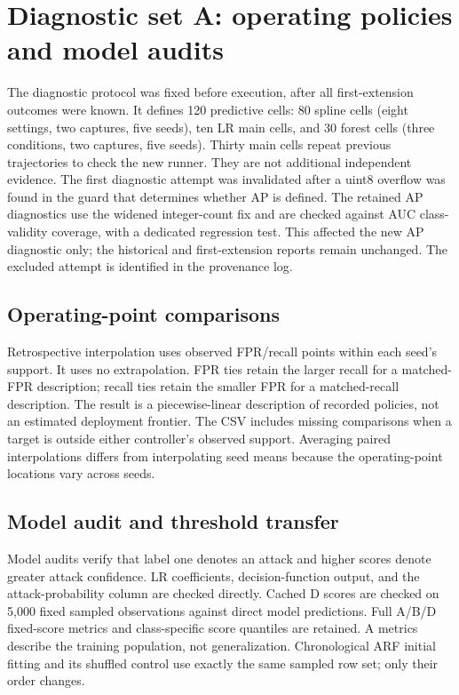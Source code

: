 \section{Diagnostic set A: operating policies and model audits}
\label{sec:diagnostic_a}
The diagnostic protocol was fixed before execution, after all first-extension outcomes were known. It defines 120 predictive cells: 80 spline cells (eight settings, two captures, five seeds), ten LR main cells, and 30 forest cells (three conditions, two captures, five seeds). Thirty main cells repeat previous trajectories to check the new runner. They are not additional independent evidence. The first diagnostic attempt was invalidated after a uint8 overflow was found in the guard that determines whether AP is defined. The retained AP diagnostics use the widened integer-count fix and are checked against AUC class-validity coverage, with a dedicated regression test. This affected the new AP diagnostic only; the historical and first-extension reports remain unchanged. The excluded attempt is identified in the provenance log.

\subsection{Operating-point comparisons}
Retrospective interpolation uses observed FPR/recall points within each seed's support. It uses no extrapolation. FPR ties retain the larger recall for a matched-FPR description; recall ties retain the smaller FPR for a matched-recall description. The result is a piecewise-linear description of recorded policies, not an estimated deployment frontier. The CSV includes missing comparisons when a target is outside either controller's observed support. Averaging paired interpolations differs from interpolating seed means because the operating-point locations vary across seeds.



\subsection{Model audit and threshold transfer}
Model audits verify that label one denotes an attack and higher scores denote greater attack confidence. LR coefficients, decision-function output, and the attack-probability column are checked directly. Cached D scores are checked on 5,000 fixed sampled observations against direct model predictions. Full A/B/D fixed-score metrics and class-specific score quantiles are retained. A metrics describe the training population, not generalization. Chronological ARF initial fitting and its shuffled control use exactly the same sampled row set; only their order changes.


